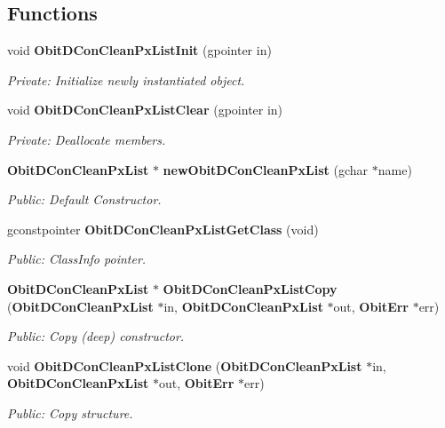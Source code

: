 \subsection*{Functions}
\begin{CompactItemize}
\item 
void {\bf Obit\-DCon\-Clean\-Px\-List\-Init} (gpointer in)
\begin{CompactList}\small\item\em Private: Initialize newly instantiated object. \item\end{CompactList}\item 
void {\bf Obit\-DCon\-Clean\-Px\-List\-Clear} (gpointer in)
\begin{CompactList}\small\item\em Private: Deallocate members. \item\end{CompactList}\item 
{\bf Obit\-DCon\-Clean\-Px\-List} $\ast$ {\bf new\-Obit\-DCon\-Clean\-Px\-List} (gchar $\ast$name)
\begin{CompactList}\small\item\em Public: Default Constructor. \item\end{CompactList}\item 
gconstpointer {\bf Obit\-DCon\-Clean\-Px\-List\-Get\-Class} (void)
\begin{CompactList}\small\item\em Public: Class\-Info pointer. \item\end{CompactList}\item 
{\bf Obit\-DCon\-Clean\-Px\-List} $\ast$ {\bf Obit\-DCon\-Clean\-Px\-List\-Copy} ({\bf Obit\-DCon\-Clean\-Px\-List} $\ast$in, {\bf Obit\-DCon\-Clean\-Px\-List} $\ast$out, {\bf Obit\-Err} $\ast$err)
\begin{CompactList}\small\item\em Public: Copy (deep) constructor. \item\end{CompactList}\item 
void {\bf Obit\-DCon\-Clean\-Px\-List\-Clone} ({\bf Obit\-DCon\-Clean\-Px\-List} $\ast$in, {\bf Obit\-DCon\-Clean\-Px\-List} $\ast$out, {\bf Obit\-Err} $\ast$err)
\begin{CompactList}\small\item\em Public: Copy structure. \item\end{CompactList}\item 

\end{CompactItemize}
